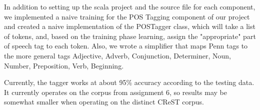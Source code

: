 \documentclass{article}
\begin{document}
\begin {flushleft}

 In addition to setting up the scala project and the source file for each component, we implemented a naive training for the POS Tagging component of our project and created a naive implementation of the POSTagger class, which will take a list of tokens, and, based on the training phase learning, assign the "appropriate" part of speech tag to each token. Also, we wrote a simplifier that maps Penn tags to the more general tags {Adjective, Adverb, Conjunction, Determiner, Noun, Number, Preposition, Verb, Beginning}.

 Currently, the tagger works at about 95\% accuracy according to the testing data. It currently operates on the corpus from assignment 6, so results may be somewhat smaller when operating on the distinct CReST corpus.
 
 \end{flushleft}
\end{document}

